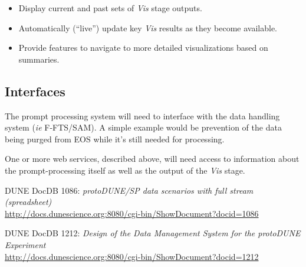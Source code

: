 \documentclass[pdftex,12pt,letter]{article}
\begin{document}
\begin{itemize}
\item Display current and past sets of \textit{Vis} stage outputs.
\item Automatically (``live'') update key \textit{Vis} results as they become available.
\item Provide features to navigate to more detailed visualizations based on summaries.
\end{itemize}


\subsection{Interfaces}
The prompt processing system will need to interface with the data handling system (\textit{ie} F-FTS/SAM). A simple example
would be prevention of the data being purged from EOS while it's still needed for processing.

One or more web services, described above, will need access to
information about the prompt-processing itself as well as the output
of the \textit{Vis} stage.


\begin{thebibliography}{1}
{DUNE DocDB 1086: \textit{ protoDUNE/SP data scenarios with full stream (spreadsheet)}}\\
\url{http://docs.dunescience.org:8080/cgi-bin/ShowDocument?docid=1086}





{DUNE DocDB 1212: \textit{Design of the Data Management System for the protoDUNE Experiment}}\\
\url{http://docs.dunescience.org:8080/cgi-bin/ShowDocument?docid=1212}


\end{thebibliography}
\end{document}
